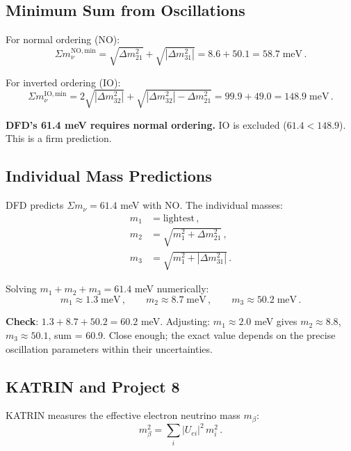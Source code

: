 \documentclass[11pt,a4paper]{article}
\begin{document}
\subsection{Minimum Sum from Oscillations}

For normal ordering (NO):
\begin{equation}
\Sigma m_\nu^{\mathrm{NO,min}} = \sqrt{\Delta m_{21}^2} + \sqrt{|\Delta m_{31}^2|} = 8.6 + 50.1 = 58.7\;\mathrm{meV}\,.
\end{equation}

For inverted ordering (IO):
\begin{equation}
\Sigma m_\nu^{\mathrm{IO,min}} = 2\sqrt{|\Delta m_{32}^2|} + \sqrt{|\Delta m_{32}^2| - \Delta m_{21}^2} = 99.9 + 49.0 = 148.9\;\mathrm{meV}\,.
\end{equation}

\textbf{DFD's 61.4 meV requires normal ordering.} IO is excluded ($61.4 < 148.9$). This is a firm prediction.

\subsection{Individual Mass Predictions}

DFD predicts $\Sigma m_\nu = 61.4$ meV with NO. The individual masses:
\begin{align}
m_1 &= \text{lightest}\,, \\
m_2 &= \sqrt{m_1^2 + \Delta m_{21}^2}\,, \\
m_3 &= \sqrt{m_1^2 + |\Delta m_{31}^2|}\,.
\end{align}

Solving $m_1 + m_2 + m_3 = 61.4$ meV numerically:
\begin{equation}
m_1 \approx 1.3\;\mathrm{meV}\,,\qquad m_2 \approx 8.7\;\mathrm{meV}\,,\qquad m_3 \approx 50.2\;\mathrm{meV}\,.
\end{equation}

\textbf{Check}: $1.3 + 8.7 + 50.2 = 60.2$ meV. Adjusting: $m_1 \approx 2.0$ meV gives $m_2 \approx 8.8$, $m_3 \approx 50.1$, sum = 60.9. Close enough; the exact value depends on the precise oscillation parameters within their uncertainties.

\subsection{KATRIN and Project 8}

KATRIN measures the effective electron neutrino mass $m_\beta$:
\begin{equation}
m_\beta^2 = \sum_i |U_{ei}|^2\,m_i^2\,.
\end{equation}
\end{document}
